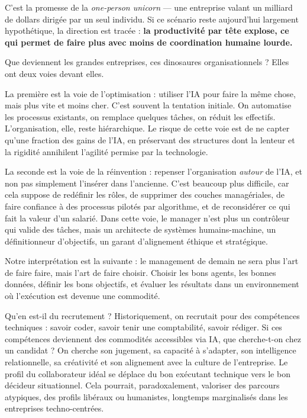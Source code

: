 C'est la promesse de la \emph{one-person unicorn} — une entreprise valant un milliard de dollars dirigée par un seul individu. Si ce scénario reste aujourd'hui largement hypothétique, la direction est tracée : \textbf{la productivité par tête explose, ce qui permet de faire plus avec moins de coordination humaine lourde.}

Que deviennent les grandes entreprises, ces dinosaures organisationnels ? Elles ont deux voies devant elles.

La première est la voie de l'optimisation : utiliser l'IA pour faire la même chose, mais plus vite et moins cher. C'est souvent la tentation initiale. On automatise les processus existants, on remplace quelques tâches, on réduit les effectifs. L'organisation, elle, reste hiérarchique. Le risque de cette voie est de ne capter qu'une fraction des gains de l'IA, en préservant des structures dont la lenteur et la rigidité annihilent l'agilité permise par la technologie.

La seconde est la voie de la réinvention : repenser l'organisation \emph{autour} de l'IA, et non pas simplement l'insérer dans l'ancienne. C'est beaucoup plus difficile, car cela suppose de redéfinir les rôles, de supprimer des couches managériales, de faire confiance à des processus pilotés par algorithme, et de reconsidérer ce qui fait la valeur d'un salarié. Dans cette voie, le manager n'est plus un contrôleur qui valide des tâches, mais un architecte de systèmes humains-machine, un définitionneur d'objectifs, un garant d'alignement éthique et stratégique.

Notre interprétation est la suivante : le management de demain ne sera plus l'art de faire faire, mais l'art de faire choisir. Choisir les bons agents, les bonnes données, définir les bons objectifs, et évaluer les résultats dans un environnement où l'exécution est devenue une commodité.

Qu'en est-il du recrutement ? Historiquement, on recrutait pour des compétences techniques : savoir coder, savoir tenir une comptabilité, savoir rédiger. Si ces compétences deviennent des commodités accessibles via IA, que cherche-t-on chez un candidat ? On cherche son jugement, sa capacité à s'adapter, son intelligence relationnelle, sa créativité et son alignement avec la culture de l'entreprise. Le profil du collaborateur idéal se déplace du bon exécutant technique vers le bon décideur situationnel. Cela pourrait, paradoxalement, valoriser des parcours atypiques, des profils libéraux ou humanistes, longtemps marginalisés dans les entreprises techno-centrées.

